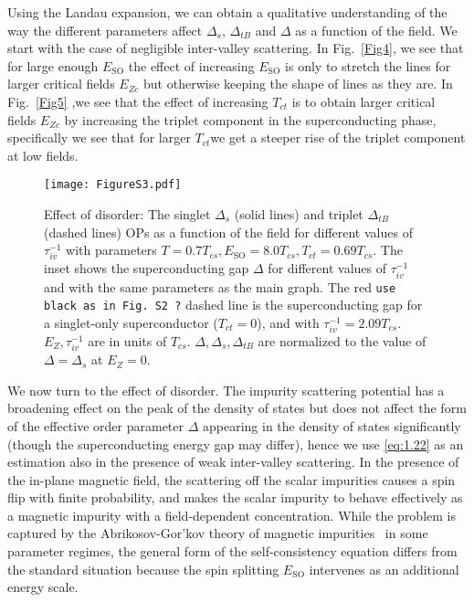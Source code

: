 \documentclass[showpacs,superscriptaddress,onecolumn,prb]{revtex4}
\begin{document}
Using the Landau expansion, we can obtain a qualitative understanding of the way the different
parameters affect  $\Delta_s$, $\Delta_{tB}$ and $\Delta$ as a function of the field. We start with the case of negligible inter-valley scattering. In Fig.~\ref{Fig4}, we see that for large enough $E_{\mathrm{SO}}$
the effect of increasing $E_{\mathrm{SO}}$ is only to stretch the lines for larger
critical fields $E_{Zc}$ but otherwise keeping the shape of lines as
they are. In Fig.~\ref{Fig5} ,we see that the effect of increasing $T_{ct}$
is to obtain larger critical fields $E_{Zc}$ by increasing the triplet component
in the superconducting phase, specifically we see that for larger $T_{ct}$we
get a steeper rise of the triplet component at low fields.


\begin{figure}
\texttt{[image: FigureS3.pdf]}
\caption{\label{Fig6} Effect of disorder:  The singlet $\Delta_s$ (solid lines) and triplet $\Delta_{tB}$
(dashed lines) OPs as a function of the field for different values
of $\tau_{iv}^{-1}$ with parameters $T=0.7T_{cs},E_{\mathrm{SO}}=8.0T_{cs},T_{ct}=0.69T_{cs}$.
The inset shows the superconducting gap $\Delta$ for different values
of $\tau_{iv}^{-1}$ and with the same parameters as the main graph. The red {\tt use black as in Fig. S2 ?}
dashed line is the superconducting gap for a singlet-only superconductor ($T_{ct}=0$), and with $\tau_{iv}^{-1}=2.09T_{cs}$. $E_Z,\tau_{iv}^{-1}$ are in
units of $T_{cs}$. $\Delta,\Delta_s,\Delta_{tB}$
are normalized to the value of $\Delta=\Delta_s$ at $E_Z=0$.}
\end{figure}

We now turn to the effect of disorder. The impurity scattering potential has a broadening effect on the peak of the density of states but does not affect the form of the effective order parameter $\Delta$ appearing in the density of states significantly (though the superconducting energy gap may differ), hence we use \eqref{eq:1.22} as an estimation also in the presence of weak inter-valley scattering.
In the presence of the in-plane magnetic field, the scattering off the scalar impurities causes a spin flip with finite probability, and makes the scalar impurity to behave effectively as a magnetic impurity with a field-dependent concentration. While the problem is captured by the Abrikosov-Gor'kov theory of magnetic impurities~\cite{AG} in some parameter regimes, the general form of the self-consistency equation differs from the standard situation because the spin splitting $E_{\mathrm{SO}}$ intervenes as an additional energy scale.
\end{document}
